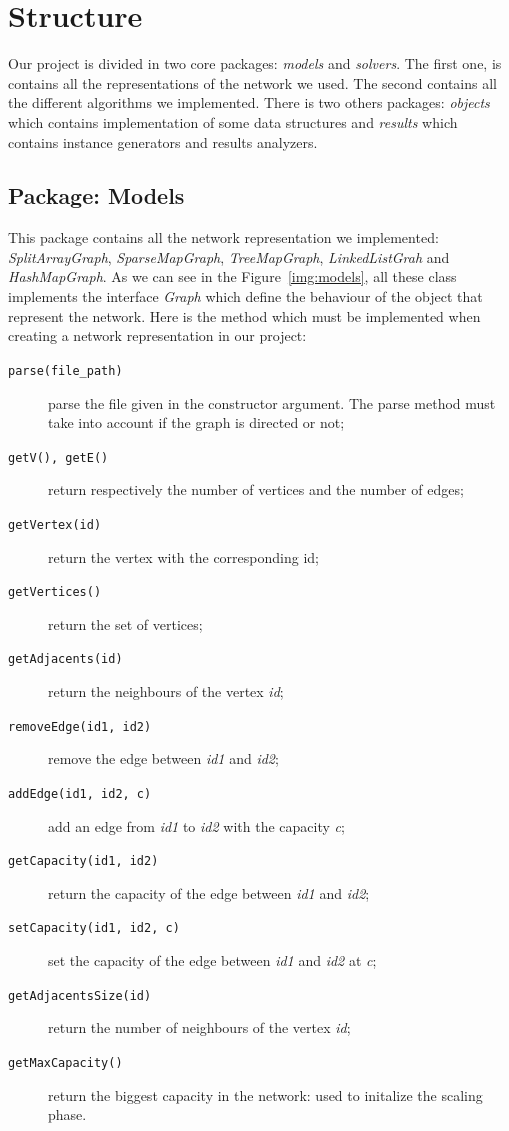 \section{Structure}

Our project is divided in two core packages: \textit{models} and \textit{solvers}. The first one, is contains all the representations of the network we used. The second contains all the different algorithms we implemented. There is two others packages: \textit{objects} which contains implementation of some data structures and \textit{results} which contains instance generators and results analyzers.

\subsection{Package: Models}

This package contains all the network representation we implemented: \textit{SplitArrayGraph}, \textit{SparseMapGraph}, \textit{TreeMapGraph}, \textit{LinkedListGrah} and \textit{HashMapGraph}. As we can see in the Figure~\ref{img:models}, all these class implements the interface \textit{Graph} which define the behaviour of the object that represent the network. Here is the method which must be implemented when creating a network representation in our project:
\begin{description}
	\item[\texttt{parse(file\_path)}] parse the file given in the constructor argument. The parse method must take into account if the graph is directed or not;
	\item[\texttt{getV(), getE()}] return respectively the number of vertices and the number of edges;
	\item[\texttt{getVertex(id)}] return the vertex with the corresponding id;
	\item[\texttt{getVertices()}] return the set of vertices;
	\item[\texttt{getAdjacents(id)}] return the neighbours of the vertex \textit{id};
	\item[\texttt{removeEdge(id1, id2)}] remove the edge between \textit{id1} and \textit{id2};
	\item[\texttt{addEdge(id1, id2, c)}] add an edge from \textit{id1} to \textit{id2} with the capacity \textit{c};
	\item[\texttt{getCapacity(id1, id2)}] return the capacity of the edge between \textit{id1} and \textit{id2};
	\item[\texttt{setCapacity(id1, id2, c)}] set the capacity of the edge between \textit{id1} and \textit{id2} at \textit{c};
	\item[\texttt{getAdjacentsSize(id)}] return the number of neighbours of the vertex \textit{id};
	\item[\texttt{getMaxCapacity()}] return the biggest capacity in the network: used to initalize the scaling phase.
\end{description}

